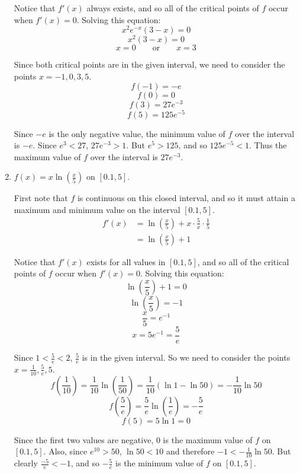 \documentclass[handout,nooutcomes]{ximera}
\begin{document}
\begin{problem}
\begin{enumerate}
\begin{freeResponse}
				Notice that $f'(x)$ always exists, and so all of the critical points of $f$ occur when $f'(x)=0$.  Solving this equation:
				$$ x^2 e^{-x} (3-x) = 0 $$
				$$ x^2 (3-x) = 0 $$
				$$ x = 0 \qquad \text{or} \qquad x=3 $$
				
				Since both critical points are in the given interval, we need to consider the points $x=-1,0,3,5$.
				$$ f(-1) = -e $$
				$$ f(0) = 0 $$
				$$ f(3) = 27e^{-3} $$
				$$ f(5) = 125 e^{-5} $$
				
				Since $-e$ is the only negative value, the minimum value of $f$ over the interval is $-e$.  Since $e^3 < 27$, $27e^{-3} > 1$.  But $e^5 > 125$, and so $125e^{-5} < 1$.  Thus the maximum value of $f$ over the interval is $27e^{-3}$.  
		
				\end{freeResponse}
				
				
				
			\item  $f(x) = x \ln \left( \frac{x}{5} \right)$ on $[0.1, 5]$.
			
				\begin{freeResponse}
				First note that $f$ is continuous on this closed interval, and so it must attain a maximum and minimum value on the interval $[0.1,5]$.
				\begin{align*}
				f'(x) &= \ln \left( \frac{x}{5} \right) + x \cdot \frac{5}{x} \cdot \frac{1}{5} \\
				&= \ln \left( \frac{x}{5} \right) + 1
				\end{align*}
				
				Notice that $f'(x)$ exists for all values in $[0.1,5]$, and so all of the critical points of $f$ occur when $f'(x)=0$.  Solving this equation:
				$$ \ln \left( \frac{x}{5} \right) + 1 = 0 $$
				$$ \ln \left( \frac{x}{5} \right) = -1 $$
				$$ \frac{x}{5} = e^{-1} $$
				$$ x = 5e^{-1} = \frac{5}{e} $$
				
				Since $1 < \frac{5}{e} < 2$, $\frac{5}{e}$ is in the given interval.  So we need to consider the points $x = \frac{1}{10}, \frac{5}{e}, 5$.
				$$ f \left( \frac{1}{10} \right) = \frac{1}{10} \ln \left( \frac{1}{50} \right)  = \frac{1}{10} \left( \ln 1 - \ln 50 \right) = -\frac{1}{10} \ln 50 $$
				$$ f \left( \frac{5}{e} \right) = \frac{5}{e} \ln \left( \frac{1}{e} \right) = - \frac{5}{e} $$
				$$ f(5) = 5 \ln 1 = 0 $$
				
				Since the first two values are negative, $0$ is the maximum value of $f$ on $[0.1,5]$.  Also, since $e^{10} > 50$, $\ln 50 < 10$ and therefore $-1 < -\frac{1}{10} \ln 50$.  But clearly $\frac{-5}{e} < -1$, and so $- \frac{5}{e}$ is the minimum value of $f$ on $[0.1, 5]$.  
				
				
		
				\end{freeResponse}
				
				
				
			\end{enumerate}

		
		
		

\end{problem}
	
\end{document}
